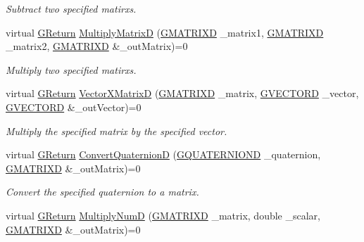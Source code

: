 \begin{DoxyCompactItemize}
\begin{DoxyCompactList}\small\item\em Subtract two specified matirxs. \end{DoxyCompactList}\item 
virtual \mbox{\hyperlink{namespaceGW_a67a839e3df7ea8a5c5686613a7a3de21}{G\+Return}} \mbox{\hyperlink{classGW_1_1MATH_1_1GMatrix_a613bcf953961899b45e6d97fc5afc2e1}{Multiply\+MatrixD}} (\mbox{\hyperlink{structGW_1_1MATH_1_1GMATRIXD}{G\+M\+A\+T\+R\+I\+XD}} \+\_\+matrix1, \mbox{\hyperlink{structGW_1_1MATH_1_1GMATRIXD}{G\+M\+A\+T\+R\+I\+XD}} \+\_\+matrix2, \mbox{\hyperlink{structGW_1_1MATH_1_1GMATRIXD}{G\+M\+A\+T\+R\+I\+XD}} \&\+\_\+out\+Matrix)=0
\begin{DoxyCompactList}\small\item\em Multiply two specified matirxs. \end{DoxyCompactList}\item 
virtual \mbox{\hyperlink{namespaceGW_a67a839e3df7ea8a5c5686613a7a3de21}{G\+Return}} \mbox{\hyperlink{classGW_1_1MATH_1_1GMatrix_a97cb7b6353e8f89405e44b09390a67cb}{Vector\+X\+MatrixD}} (\mbox{\hyperlink{structGW_1_1MATH_1_1GMATRIXD}{G\+M\+A\+T\+R\+I\+XD}} \+\_\+matrix, \mbox{\hyperlink{structGW_1_1MATH_1_1GVECTORD}{G\+V\+E\+C\+T\+O\+RD}} \+\_\+vector, \mbox{\hyperlink{structGW_1_1MATH_1_1GVECTORD}{G\+V\+E\+C\+T\+O\+RD}} \&\+\_\+out\+Vector)=0
\begin{DoxyCompactList}\small\item\em Multiply the specified matrix by the specified vector. \end{DoxyCompactList}\item 
virtual \mbox{\hyperlink{namespaceGW_a67a839e3df7ea8a5c5686613a7a3de21}{G\+Return}} \mbox{\hyperlink{classGW_1_1MATH_1_1GMatrix_a602c82afc9b9f55c10d6a61da54dcb6c}{Convert\+QuaternionD}} (\mbox{\hyperlink{structGW_1_1MATH_1_1GQUATERNIOND}{G\+Q\+U\+A\+T\+E\+R\+N\+I\+O\+ND}} \+\_\+quaternion, \mbox{\hyperlink{structGW_1_1MATH_1_1GMATRIXD}{G\+M\+A\+T\+R\+I\+XD}} \&\+\_\+out\+Matrix)=0
\begin{DoxyCompactList}\small\item\em Convert the specified quaternion to a matrix. \end{DoxyCompactList}\item 
virtual \mbox{\hyperlink{namespaceGW_a67a839e3df7ea8a5c5686613a7a3de21}{G\+Return}} \mbox{\hyperlink{classGW_1_1MATH_1_1GMatrix_a34e78f82e720eba937824cdc06490b9c}{Multiply\+NumD}} (\mbox{\hyperlink{structGW_1_1MATH_1_1GMATRIXD}{G\+M\+A\+T\+R\+I\+XD}} \+\_\+matrix, double \+\_\+scalar, \mbox{\hyperlink{structGW_1_1MATH_1_1GMATRIXD}{G\+M\+A\+T\+R\+I\+XD}} \&\+\_\+out\+Matrix)=0

\end{DoxyCompactItemize}
